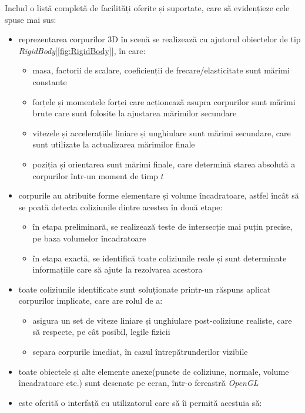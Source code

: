 \documentclass[12pt,a4paper]{report}
\begin{document}
Includ o listă completă de facilități oferite și suportate, care să evidențieze cele spuse mai sus:
\begin{itemize}
	\item reprezentarea corpurilor 3D în scenă se realizează cu ajutorul obiectelor de tip \textit{RigidBody}[\autoref{fig:RigidBody}], în care:
		\begin{itemize}
			\item masa, factorii de scalare, coeficienții de frecare/elasticitate sunt mărimi constante
			\item forțele și momentele forței care acționează asupra corpurilor sunt mărimi brute care sunt folosite la ajustarea mărimilor secundare
			\item vitezele și accelerațiile liniare și unghiulare sunt mărimi secundare, care sunt utilizate la actualizarea mărimilor finale
			\item poziția și orientarea sunt mărimi finale, care determină starea absolută a corpurilor într-un moment de timp $t$
		\end{itemize}
	\item corpurile au atribuite forme elementare și volume încadratoare, astfel încât să se poată detecta coliziunile dintre acestea în două etape:
		\begin{itemize}
			\item în etapa preliminară, se realizează teste de intersecție mai puțin precise, pe baza volumelor încadratoare
			\item în etapa exactă, se identifică toate coliziunile reale și sunt determinate informațiile care să ajute la rezolvarea acestora
		\end{itemize}
	\item toate coliziunile identificate sunt soluționate printr-un răspuns aplicat corpurilor implicate, care are rolul de a:
		\begin{itemize}
			\item asigura un set de viteze liniare și unghiulare post-coliziune realiste, care să respecte, pe cât posibil, legile fizicii
			\item separa corpurile imediat, în cazul întrepătrunderilor vizibile
		\end{itemize}
	\item toate obiectele și alte elemente anexe(puncte de coliziune, normale, volume încadratoare etc.) sunt desenate pe ecran, într-o fereastră \textit{OpenGL}
	\item este oferită o interfață cu utilizatorul care să îi permită acestuia să:

\end{itemize}
\end{document}
